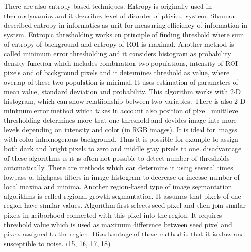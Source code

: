 \documentclass[a4paper,12pt]{article}   %
\numberwithin{equation}{section}        %
\begin{document}
        There are also entropy-based techniques. Entropy is originally
        used in thermodynamics and it describes level of disorder of phisical system. Shannon described entropy in informatics as unit for measuring efficiency of information in system.
        Entropic thresholding works on principle of finding threshold where sum of entropy of background and entropy of ROI is maximal. Another method is called minimum error thresholding
        and it considers histogram as probability density function which includes combination two populations, intensity of ROI pixels and of background pixels and
        it determines threshold as value, where overlap of these two population is minimal. It uses estimation of parameters of mean value, standard deviation and probability.
        This algorithm works with 2-D histogram, which can show relatiionship between two variables. There is also 2-D minimum error method which takes in account also position of pixel.
        multilevel thresholding determines more that one threshold and devides image into more levels depending on intensity and color (in RGB images). It is ideal for images with color
        inhomogenous background. Thus it is possible for example to assign both dark and bright pixels to zero and middle gray pixels to one. disadvantage of these algorithms is
        it is often not possible to detect number of thresholds automatically. There are methods which can determine it using several times lowpass or highpass filters in image histogram
        to decrease or incease number of local maxina and minima.
        Another region-based type of image segmantation algorithms is called regional growth segmantation. It assumes that pixels of one region have similar values. Algorithm first selects
        seed pixel and then join similar pixels in neiborhood connected with this pixel into the region. It requires threshold value which is used as maximum difference between seed pixel
        and pixels assigned to the region. Disadvantage of these method is that it is slow and susceptible to noise. (15, 16, 17, 18)
\end{document}
